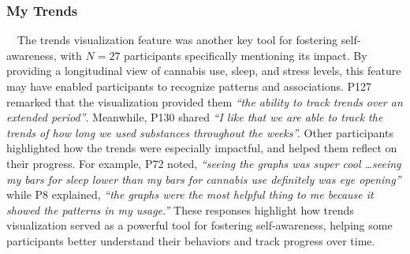 \subsubsection{My Trends}~\ The trends visualization feature was another key tool for fostering self-awareness, with $N=27$ participants specifically mentioning its impact. By providing a longitudinal view of cannabis use, sleep, and stress levels, this feature may have enabled participants to recognize patterns and associations. P127 remarked that the visualization provided them \emph{``the ability to track trends over an extended period''}. Meanwhile, P130 shared \emph{``I like that we are able to track the trends of how long we used substances throughout the weeks''.} Other participants highlighted how the trends were especially impactful,
and helped them reflect on their progress. For example, P72 noted, \emph{``seeing the graphs was super cool \ldots seeing my bars for sleep lower than my bars for cannabis use definitely was eye opening''} while P8 explained, \emph{``the graphs were the most helpful thing to me because it showed the patterns in my usage.''} 
These responses highlight how trends visualization served as a powerful tool for fostering self-awareness, helping some participants better understand their behaviors and track progress over time.



